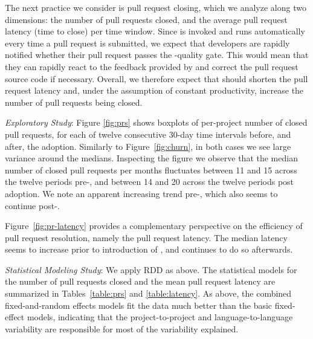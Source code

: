 

The next practice we consider is pull request closing, which we analyze along two 
dimensions: the number of pull requests closed, and the average
pull request latency (\ie time to close) per time window.
Since \Tvis is invoked and runs automatically every time a pull request is submitted, 
we expect that developers are rapidly notified whether their pull request passes the 
\Tvi-quality gate.
This would mean that they can rapidly react to the feedback provided by \Tvi and 
correct the pull request source code if necessary.
Overall, we therefore expect that \Tvis should shorten the pull request latency and, 
under the assumption of constant productivity, increase the number of pull requests 
being closed.

\smallskip\noindent \emph{Exploratory Study}:
Figure
\ref{fig:prs} shows boxplots of per-project number of closed pull requests, for each 
of twelve consecutive 30-day time intervals before, and after, the \Tvis adoption. 
Similarly to Figure~\ref{fig:churn}, in both cases we see large variance around the 
medians. 
Inspecting the figure we observe that the median number of closed pull requests 
per months fluctuates between 11 and 15 across the twelve periods pre-\Tvi, and 
between 14 and 20 across the twelve periods post adoption.
We note an apparent increasing trend pre-\Tvi, which also seems to continue post-\Tvi.

Figure~\ref{fig:pr-latency} provides a complementary perspective on the efficiency 
of pull request resolution, namely the pull request latency.
The median latency seems to increase prior to introduction of \Tvis, and continues
to do so afterwards. %

\smallskip\noindent \emph{Statistical Modeling Study}:
We apply RDD as above. 
The statistical models for the number of pull requests closed and the mean pull 
request latency are summarized in Tables~\ref{table:prs} and \ref{table:latency}.
As above, the combined fixed-and-random effects models fit the data much 
better than the basic fixed-effect models, indicating that the project-to-project 
and language-to-language variability are responsible for most of the variability 
explained.

